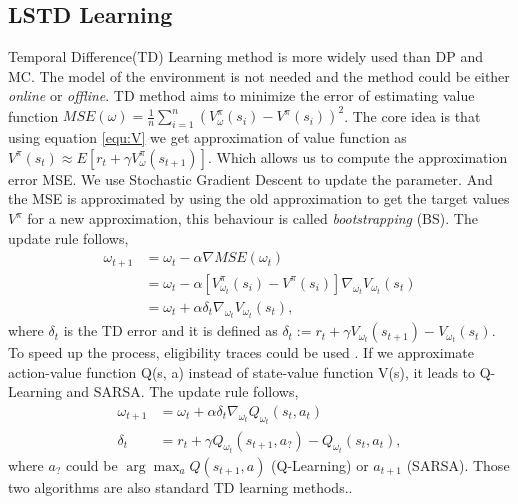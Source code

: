 \subsection{LSTD Learning}
Temporal Difference(TD) Learning method is more widely used than DP and MC. 
The model of the environment is not needed and the method could be either \textit{online} or \textit{offline}.
TD method aims to minimize the error of estimating value function $MSE(\omega) = \frac{1}{n} \sum_{i=1}^{n}(V_\omega^\pi (s_i) - V^{\pi}(s_i))^2$. The core idea is that using equation \eqref{equ:V} we get approximation of value function as $V^\pi (s_t) \approx E[r_t + \gamma V_\omega ^\pi(s_{t+1})] $. Which allows us to compute the approximation error MSE.  We use Stochastic Gradient Descent to  update the parameter. And the MSE is approximated by using the old approximation to get the target values $V^\pi$ for a new approximation, this behaviour is called \textit{bootstrapping} (BS).
The update rule follows,
\begin{align}
\omega_{t+1}  &= \omega_{t} - \alpha \nabla MSE(\omega_t)\nonumber  \\
		&= \omega_t -\alpha [V_{\omega_t}^\pi(s_i) - V^{\pi}(s_i)] \nabla_{\omega_t}V_{\omega_t} (s_t) \nonumber \\
		&= \omega_t + \alpha \delta_t \nabla_{\omega_t} V_{\omega_t}(s_t),
\end{align}
where $\delta_t$ is the TD error and it is defined as $\delta_t := r_{t} + \gamma V_{\omega_t}(s_{t+1}) - V_{\omega_t}(s_t)$.
To speed up the process, eligibility traces could be used \cite{boyan1999least}. 
If we approximate action-value function Q(s, a) instead of state-value function V(s), it leads to Q-Learning and SARSA. The update rule follows,
\begin{align}
\omega_{t+1} &= \omega_t + \alpha \delta_t \nabla_{\omega_t} Q_{\omega_t}(s_t, a_t) \label{equ:Q:learn}\\
\delta_t &= r_{t} + \gamma Q_{\omega_t}(s_{t+1}, a_{?}) - Q_{\omega_t}(s_t, a_t) \label{equ:Q:learn2},
\end{align}
where $a_{?}$ could be $\arg\max_a Q(s_{t+1}, a)$ (Q-Learning) or $a_{t+1}$ (SARSA). Those two algorithms are also standard TD learning methods..
